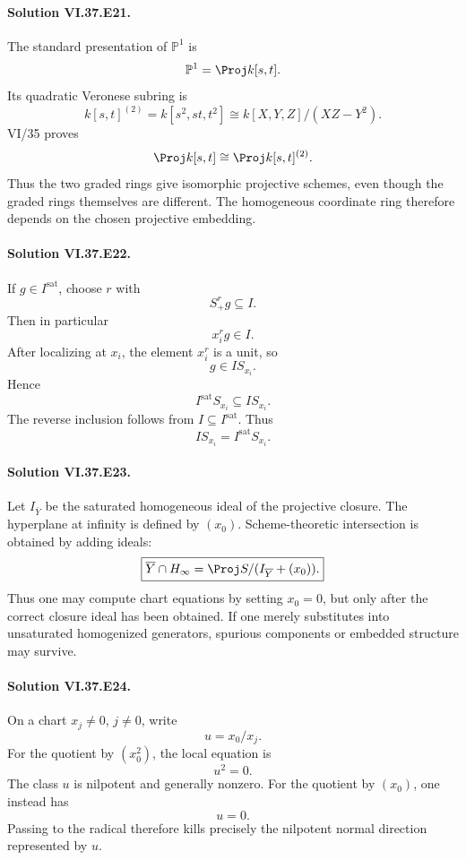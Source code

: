 \paragraph{Solution VI.37.E21.}
The standard presentation of \(\mathbb P^1\) is
\[
\mathbb P^1=\Proj k[s,t].
\]
Its quadratic Veronese subring is
\[
k[s,t]^{(2)}
=
k[s^2,st,t^2]
\cong
k[X,Y,Z]/(XZ-Y^2).
\]
VI/35 proves
\[
\Proj k[s,t]\cong\Proj k[s,t]^{(2)}.
\]
Thus the two graded rings give isomorphic projective schemes, even though the graded rings themselves are different. The homogeneous coordinate ring therefore depends on the chosen projective embedding.

\paragraph{Solution VI.37.E22.}
If \(g\in I^{\mathrm{sat}}\), choose \(r\) with
\[
S_+^r g\subseteq I.
\]
Then in particular
\[
x_i^r g\in I.
\]
After localizing at \(x_i\), the element \(x_i^r\) is a unit, so
\[
g\in IS_{x_i}.
\]
Hence
\[
I^{\mathrm{sat}}S_{x_i}\subseteq IS_{x_i}.
\]
The reverse inclusion follows from \(I\subseteq I^{\mathrm{sat}}\). Thus
\[
\boxed{IS_{x_i}=I^{\mathrm{sat}}S_{x_i}}.
\]

\paragraph{Solution VI.37.E23.}
Let \(I_{\overline Y}\) be the saturated homogeneous ideal of the projective closure. The hyperplane at infinity is defined by \((x_0)\). Scheme-theoretic intersection is obtained by adding ideals:
\[
\boxed{
\overline Y\cap H_\infty
=
\Proj S/(I_{\overline Y}+(x_0)).
}
\]
Thus one may compute chart equations by setting \(x_0=0\), but only after the correct closure ideal has been obtained. If one merely substitutes into unsaturated homogenized generators, spurious components or embedded structure may survive.

\paragraph{Solution VI.37.E24.}
On a chart \(x_j\neq0\), \(j\neq0\), write
\[
u=x_0/x_j.
\]
For the quotient by \((x_0^2)\), the local equation is
\[
u^2=0.
\]
The class \(u\) is nilpotent and generally nonzero. For the quotient by \((x_0)\), one instead has
\[
u=0.
\]
Passing to the radical therefore kills precisely the nilpotent normal direction represented by \(u\).


